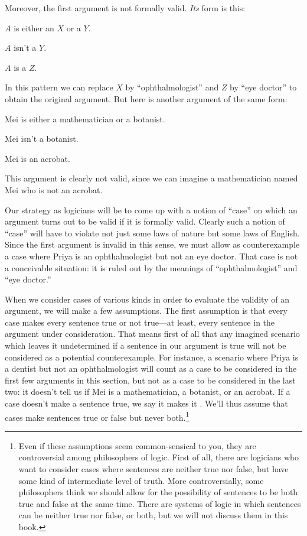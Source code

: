 Moreover, the first argument is not formally valid. \emph{Its} form is this:
\begin{earg}
	\item[] $A$ is either an $X$ or a $Y$.
	\item[] $A$ isn't a $Y$.
	\item[\texttherefore] $A$ is a $Z$.
\end{earg}
In this pattern we can replace $X$ by ``ophthalmologist'' and $Z$ by ``eye doctor'' to obtain the original argument.  But here is another argument of the same form:
\begin{earg}
	\item[] Mei is either a mathematician or a botanist.
	\item[] Mei isn't a botanist.
	\item[\texttherefore] Mei is an acrobat.
\end{earg}
This argument is clearly not valid, since we can imagine a mathematician named Mei who is not an acrobat.

Our strategy as logicians will be to come up with a notion of ``case'' on which an argument turns out to be valid if it is formally valid. Clearly such a notion of ``case'' will have to violate not just some laws of nature but some laws of English. Since the first argument is invalid in this sense, we must allow as counterexample a case where Priya is an ophthalmologist but not an eye doctor.  That case is not a conceivable situation: it is ruled out by the meanings of ``ophthalmologist'' and ``eye doctor.''

When we consider cases of various kinds in order to evaluate the validity of an argument, we will make a few assumptions. The first assumption is that every case makes every sentence true or not true---at least, every sentence in the argument under consideration. That means first of all that any imagined scenario which leaves it undetermined if a sentence in our argument is true will not be considered as a potential counterexample. For instance, a scenario where Priya is a dentist but not an ophthalmologist will count as a case to be considered in the first few arguments in this section, but not as a case to be considered in the last two: it doesn't tell us if Mei is a mathematician, a botanist, or an acrobat. If a case doesn't make a sentence true, we say it makes it . We'll thus assume that cases make sentences true or false but never both.\footnote{Even if these assumptions seem common-sensical to you, they are controversial among philosophers of logic. First of all, there are logicians who want to consider cases where sentences are neither true nor false, but have some kind of intermediate level of truth. More controversially, some philosophers think we should allow for the possibility of sentences to be both true and false at the same time. There are systems of logic in which sentences can be neither true nor false, or both, but we will not discuss them in this book.}

